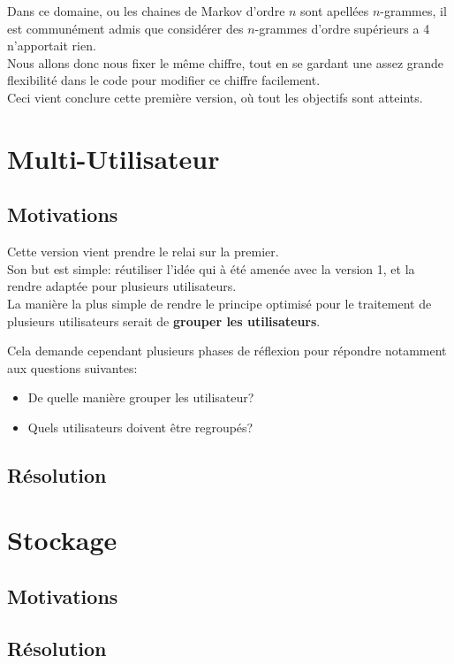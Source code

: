             Dans ce domaine, ou les chaines de Markov d'ordre $n$ sont apellées $n$-grammes, il est communément admis que considérer des $n$-grammes d'ordre supérieurs a 4 n'apportait rien.\\
            Nous allons donc nous fixer le même chiffre, tout en se gardant une assez grande flexibilité dans le code pour modifier ce chiffre facilement.\\

            Ceci vient conclure cette première version, où tout les objectifs sont atteints.
    \section{Multi-Utilisateur}
        \subsection{Motivations}
          Cette version vient prendre le relai sur la premier.\\
          Son but est simple: réutiliser l'idée qui à été amenée avec la version 1, et la rendre adaptée pour plusieurs utilisateurs.\\

          La manière la plus simple de rendre le principe optimisé pour le traitement de plusieurs utilisateurs serait de \textbf{grouper les utilisateurs}.

          Cela demande cependant plusieurs phases de réflexion pour répondre notamment aux questions suivantes:
          \begin{itemize}
            \item De quelle manière grouper les utilisateur?
            \item Quels utilisateurs doivent être regroupés?
          \end{itemize}
        \subsection{Résolution}
    \section{Stockage}
        \subsection{Motivations}
        \subsection{Résolution}
